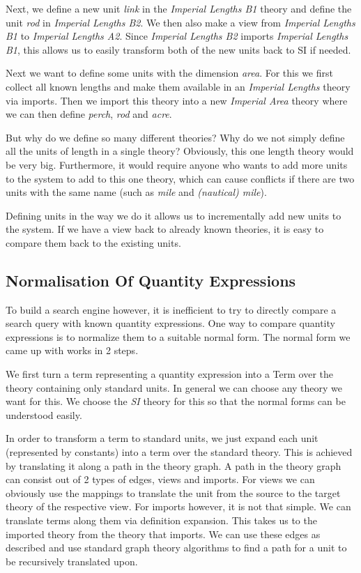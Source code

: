 Next, we define a new unit \textit{link} in the \textit{Imperial Lengths B1} theory and define the unit \textit{rod} in \textit{Imperial Lengths B2}. We then also make a view from \textit{Imperial Lengths B1} to \textit{Imperial Lengths A2}. Since \textit{Imperial Lengths B2} imports \textit{Imperial Lengths B1}, this allows us to easily transform both of the new units back to SI if needed.

Next we want to define some units with the dimension \textit{area}. For this we first collect all known lengths and make them available in an \textit{Imperial Lengths} theory via imports. Then we import this theory into a new \textit{Imperial Area} theory where we can then define \textit{perch}, \textit{rod} and \textit{acre}.

But why do we define so many different theories? Why do we not simply define all the units of length in a single theory? Obviously, this one length theory would be very big. Furthermore, it would require anyone who wants to add more units to the system to add to this one theory, which can cause conflicts if there are two units with the same name (such as \textit{mile} and \textit{(nautical) mile}).

Defining units in the way we do it allows us to incrementally add new units to the system. If we have a view back to already known theories, it is easy to compare them back to the existing units.

\subsection{Normalisation Of Quantity Expressions}
\label{sec:norm}

To build a search engine however, it is inefficient to try to directly compare a search query with known quantity expressions. One way to compare quantity expressions is to normalize them to a suitable normal form. The normal form we came up with works in 2 steps.

We first turn a term representing a quantity expression into a Term over the theory containing only standard units. In general we can choose any theory we want for this. We choose the \textit{SI} theory for this so that the normal forms can be understood easily.

In order to transform a term to standard units, we just expand each unit (represented by constants) into a term over the standard theory. This is achieved by translating it along a path in the theory graph. A path in the theory graph can consist out of 2 types of edges, views and imports. For views we can obviously use the mappings to translate the unit from the source to the target theory of the respective view. For imports however, it is not that simple. We can translate terms along them via definition expansion. This takes us to the imported theory from the theory that imports. We can use these edges as described and use standard graph theory algorithms to find a path for a unit to be recursively translated upon.

